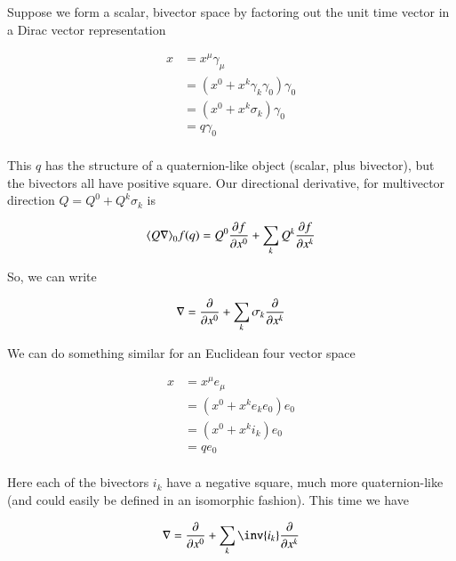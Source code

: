 Suppose we form a scalar, bivector space by factoring out the unit time vector in a Dirac vector representation

\begin{align*}
x 
&= x^\mu \gamma_\mu \\
&= \left( x^0 + x^k \gamma_k \gamma_0 \right) \gamma_0 \\
&= \left( x^0 + x^k \sigma_k \right) \gamma_0 \\
&= q \gamma_0 \\
\end{align*}

This $q$ has the structure of a quaternion-like object (scalar, plus bivector), but the bivectors all have positive square.  Our directional
derivative, for multivector direction $Q = Q^0 + Q^k \sigma_k$ is 

\begin{align*}
\gpgradezero{Q \grad} f(q) 
&= Q^0 \PD{x^0}{f} + \sum_k Q^k \PD{x^k}{f} \\
\end{align*}

So, we can write

\begin{align*}
\grad 
&= \PD{x^0}{} + \sum_k \sigma_k \PD{x^k}{} \\
\end{align*}

We can do something similar for an Euclidean four vector space

\begin{align*}
x 
&= x^\mu e_\mu \\
&= \left( x^0 + x^k e_k e_0 \right) e_0 \\
&= \left( x^0 + x^k i_k \right) e_0 \\
&= q e_0 \\
\end{align*}

Here each of the bivectors $i_k$ have a negative square, much more quaternion-like (and could easily be defined in an
isomorphic fashion).  This time we have

\begin{align*}
\grad 
&= \PD{x^0}{} + \sum_k \inv{i_k} \PD{x^k}{} \\
\end{align*}

